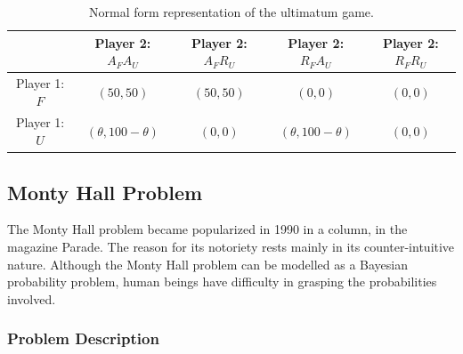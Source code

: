 \begin{center}
\begin{table}[h]
\begin{centering}
\begin{tabular}{ccccc}
\hline 
 & Player 2: $A_{F}A_{U}$ & Player 2: $A_{F}R_{U}$ & Player 2: $R_{F}A_{U}$ & Player 2: $R_{F}R_{U}$\tabularnewline
\hline 
Player 1: $F$ & $(50,50)$ & $(50,50)$& $(0,0)$ & $(0,0)$\tabularnewline
Player 1: $U$ & $(\theta,100-\theta)$ & $(0,0)$& $(\theta,100-\theta)$ & $(0,0)$\tabularnewline
\hline 
\end{tabular}
\par\end{centering}

\caption{Normal form representation of the ultimatum game.}
\label{tab:tabelaultimatumestoufofida}
\end{table}
\par\end{center}








































\subsection{Monty Hall Problem}
\label{subsec:monty_hall}

The Monty Hall problem became popularized in 1990 in a column, in the magazine Parade\cite{Savant1990}. The reason for its notoriety rests mainly in its counter-intuitive nature. Although the Monty Hall problem can be modelled as a Bayesian probability problem, human beings have difficulty in grasping the probabilities involved.

\subsubsection{Problem Description}
\label{subsubsec:monty_hall_problem description}

